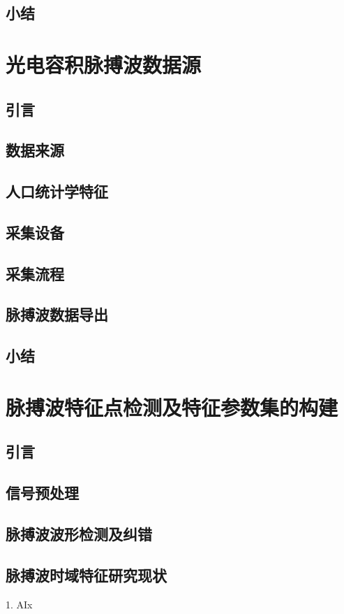 \section{小结}

\chapter{光电容积脉搏波数据源}
\section{引言}
\section{数据来源}
\section{人口统计学特征}
\section{采集设备}
\section{采集流程}
\section{脉搏波数据导出}
\section{小结}


\chapter{脉搏波特征点检测及特征参数集的构建}
\section{引言}
\section{信号预处理}
\section{脉搏波波形检测及纠错}
\section{脉搏波时域特征研究现状}
1. AIx

